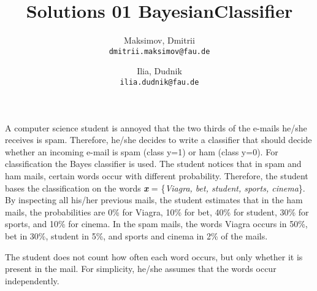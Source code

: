 \documentclass{homework}
\title{Solutions 01 BayesianClassifier}
\author{
  Maksimov, Dmitrii\\
  \texttt{dmitrii.maksimov@fau.de}
  \and
  Ilia, Dudnik\\
  \texttt{ilia.dudnik@fau.de}
}
\begin{document}
\maketitle

\exercise
A computer science student is annoyed that the two thirds of the e-mails he/she
receives is spam. Therefore, he/she decides to write a classifier that should decide whether an incoming e-mail is spam (class y=1) or ham (class y=0). For
classification the Bayes classifier is used. The student notices that in spam and
ham mails, certain words occur with different probability. Therefore, the student
bases the classification on the words \textbf{\emph{x}} = \{\emph{Viagra, bet, student, sports, cinema}\}. By inspecting all his/her previous mails, the student estimates that in the ham mails, the probabilities are 0\% for Viagra, 10\% for bet, 40\% for student, 30\% for
sports, and 10\% for cinema. In the spam mails, the words Viagra occurs in 50\%,
bet in 30\%, student in 5\%, and sports and cinema in 2\% of the mails.

The student does not count how often each word occurs, but only whether it is present in the mail. For simplicity, he/she assumes that the words occur independently.
\end{document}
